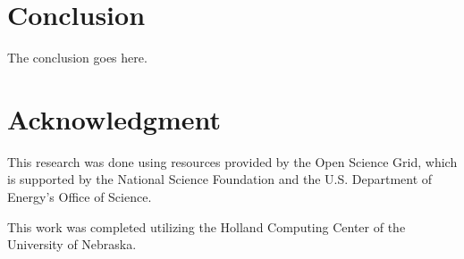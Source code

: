 \documentclass[conference]{IEEEtran}
\begin{document}



\section{Conclusion}
The conclusion goes here.






\section*{Acknowledgment}
This research was done using resources provided by the Open Science Grid, which is supported by the National Science Foundation and the U.S. Department of Energy's Office of Science.

This work was completed utilizing the Holland Computing Center of the University of Nebraska.







%
%
%





\end{document}
